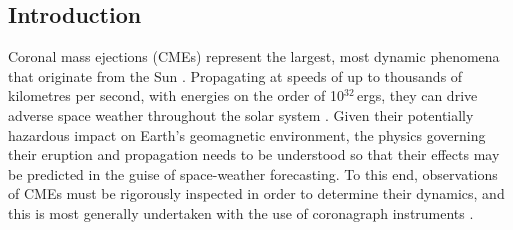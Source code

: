 \documentclass[referee,a4paper,12pt,traditabstract]{swsc}
\begin{document}
\begin{linenumbers}
   
   
   
   
   
   
   
   
   


   \maketitle

\section{Introduction}

Coronal mass ejections (CMEs) represent the largest, most dynamic phenomena that originate from the Sun \citep{2011LRSP....8....1C,2012LRSP....9....3W}. Propagating at speeds of up to thousands of kilometres per second, with energies on the order of 10$^{32}$\,ergs, they can drive adverse space weather throughout the solar system \citep{2005A&A...440..373H,2007LRSP....4....1P}. Given their potentially hazardous impact on Earth's geomagnetic environment, the physics governing their eruption and propagation needs to be understood so that their effects may be predicted in the guise of space-weather forecasting. To this end, observations of CMEs must be rigorously inspected in order to determine their dynamics, and this is most generally undertaken with the use of coronagraph instruments \citep[e.g.,][]{1975Koomen,1980ApJ...237L..99S,1980SoPh...65...91M,1985JGR....90..275I,1993JGR....9813177H, 1995SoPh..162..357B, 2008SSRv..136...67H}. 


\end{linenumbers}
\end{document}
